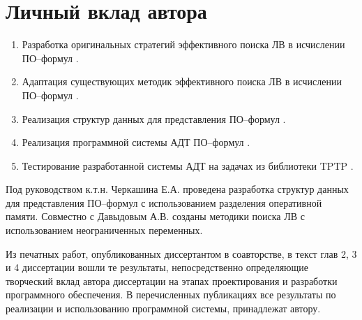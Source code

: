 \section*{Личный вклад автора}
\begin{enumerate}
\item Разработка оригинальных стратегий эффективного поиска ЛВ в исчислении ПО--формул \cite{mais, burvest, viner, QUANT4, mipro}.
\item Адаптация существующих методик эффективного поиска ЛВ в исчислении ПО--формул \cite{mais, distvirt, viner, mipro}.
\item Реализация структур данных для представления ПО--формул \cite{mais, viner, mipro, QUANT4}.
\item Реализация программной системы АДТ ПО--формул \cite{distvirt, burvest, viner, mipro, QUANT4}.
\item Тестирование разработанной системы АДТ на задачах из библиотеки TPTP \cite{distvirt, viner, mipro}.
\end{enumerate}

Под руководством к.т.н. Черкашина Е.А. проведена разработка структур данных для представления ПО--формул с использованием разделения оперативной памяти. Совместно с Давыдовым А.В. созданы методики поиска ЛВ с использованием неограниченных переменных.

Из печатных работ, опубликованных диссертантом в соавторстве, в текст глав 2, 3 и 4 диссертации вошли те результаты, непосредственно определяющие творческий вклад автора диссертации на этапах проектирования и разработки программного обеспечения. В перечисленных публикациях все результаты по реализации и использованию программной системы, принадлежат автору.




